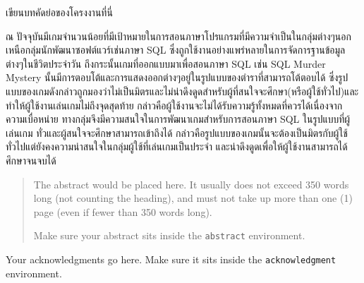 \maketitle
\makesignature

\ifproject
\begin{abstractTH}
เขียนบทคัดย่อของโครงงานที่นี่

ณ ปัจจุบันมีเกมจำนวนน้อยที่มีเป้าหมายในการสอนภาษาโปรแกรมที่มีความจำเป็นในกลุ่มต่างๆนอกเหนือกลุ่มนักพัฒนาซอฟต์แวร์เช่นภาษา SQL ซึ่งถูกใช้งานอย่างแพร่หลายในการจัดการฐานข้อมูลต่างๆในชีวิตประจำวัน ถึงกระนั้นเกมที่ออกแบบมาเพื่อสอนภาษา SQL เช่น SQL Murder Mystery นั้นมีการตอบโต้และการแสดงออกต่างๆอยู่ในรูปแบบของตำราที่สามารถโต้ตอบได้ ซึ่งรูปแบบของเกมดังกล่าวถูกมองว่าไม่เป็นมิตรและไม่น่าดึงดูดสำหรับผู้ที่สนใจจะศึกษา(หรือผู้ใช้ทั่วไป)และทำให้ผู้ใช้งานเล่นเกมไม่ถึงจุดสุดท้าย กล่าวคือผู้ใช้งานจะไม่ได้รับความรู้ทั้งหมดที่ควรได้เนื่องจากความเบื่อหน่าย ทางกลุ่มจึงมีความสนใจในการพัฒนาเกมสำหรับการสอนภาษา SQL ในรูปแบบที่ผู้เล่นเกม ทั่วและผู้สนใจจะศึกษาสามารถเข้าถึงได้ กล่าวคือรูปแบบของเกมนั้นจะต้องเป็นมิตรกับผู้ใช้ทั่วไปแต่ยังคงความน่าสนใจในกลุ่มผู้ใช้ที่เล่นเกมเป็นประจำ และน่าดึงดูดเพื่อให้ผู้ใช้งานสามารถได้ศึกษาจนจบได้
\end{abstractTH}

\begin{abstract}
The abstract would be placed here. It usually does not exceed 350 words
long (not counting the heading), and must not take up more than one (1) page
(even if fewer than 350 words long).

Make sure your abstract sits inside the \texttt{abstract} environment.
\end{abstract}

\iffalse
\begin{dedication}
This document is dedicated to all Chiang Mai University students.

Dedication page is optional.
\end{dedication}
\fi %

\begin{acknowledgments}
Your acknowledgments go here. Make sure it sits inside the
\texttt{acknowledgment} environment.

\end{acknowledgments}%
\fi %

\contentspage

\ifproject
\figurelistpage

\tablelistpage
\fi %



